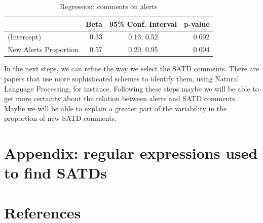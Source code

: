 \documentclass[
]{article}
\begin{document}
%
%

%
%

%
%

%
%

\begin{table}[h!]
\caption{\label{tab:unnamed-chunk-25}\label{tab_reg} Regression: comments on alerts}
\centering
\begin{tabular}[t]{l|rcr}
\hline
 & Beta & 95\% Conf. Interval & p-value\\
\hline
(Intercept) & 0.33 & 0.13, 0.52 & 0.002\\
New Alerts Proportion & 0.57 & 0.20, 0.95 & 0.004\\
\hline
\end{tabular}
\end{table}

In the next steps, we can refine the way we select the SATD comments. There are papers that use more sophisticated schemes to identify them, using Natural Language Processing, for instance. Following these steps maybe we will be able to get more certainty about the relation between alerts and SATD comments. Maybe we will be able to explain a greater part of the variability in the proportion of new SATD comments.

%
%


%
%

\section*{Appendix: regular expressions used to find SATDs}
\label{sec_SATDs}

\small

\normalsize


%
%

\section*{References}
\end{document}
